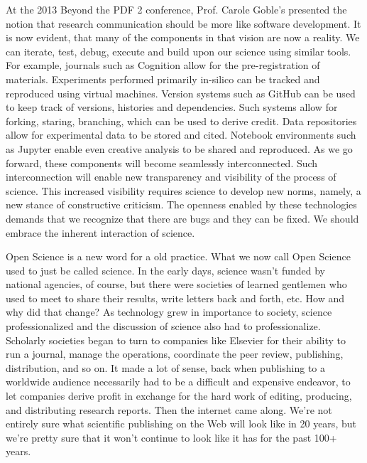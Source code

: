 \documentclass[a4paper,USenglish]{dagrep}
\begin{document}
{}
\license
At the 2013 Beyond the PDF 2 conference, Prof. Carole Goble's presented the
notion that research communication should be more like software development. It
is now evident, that many of the components in that vision are now a reality. We
can iterate, test, debug, execute and build upon our science using similar
tools. For example, journals such as Cognition allow for the pre-registration of
materials. Experiments performed primarily in-silico can be tracked and
reproduced using virtual machines. Version systems such as GitHub can be used to
keep track of versions, histories and dependencies. Such systems allow for
forking, staring, branching, which can be used to derive credit. Data
repositories allow for experimental data to be stored and cited. Notebook
environments such as Jupyter enable even creative analysis to be shared and
reproduced. As we go forward, these components will become seamlessly
interconnected. Such interconnection will enable new transparency and visibility
of the process of science. This increased visibility requires science to develop
new norms, namely, a new stance of constructive criticism. The openness enabled
by these technologies demands that we recognize that there are bugs and they can
be fixed. We should embrace the inherent interaction of science. 


{}
\license
Open Science is a new word for a old practice. What we now call Open Science
used to just be called science. In the early days, science wasn't funded by
national agencies, of course, but there were societies of learned gentlemen who
used to meet to share their results, write letters back and forth, etc. How and
why did that change? As technology grew in importance to society, science
professionalized and the discussion of science also had to professionalize.
Scholarly societies began to turn to companies like Elsevier for their ability
to run a journal, manage the operations, coordinate the peer review, publishing,
distribution, and so on. It made a lot of sense, back when publishing to a
worldwide audience necessarily had to be a difficult and expensive endeavor, to
let companies derive profit in exchange for the hard work of editing, producing,
and distributing research reports. Then the internet came along. We're not
entirely sure what scientific publishing on the Web will look like in 20 years,
but we're pretty sure that it won't continue to look like it has for the past
100+ years.
\end{document}
